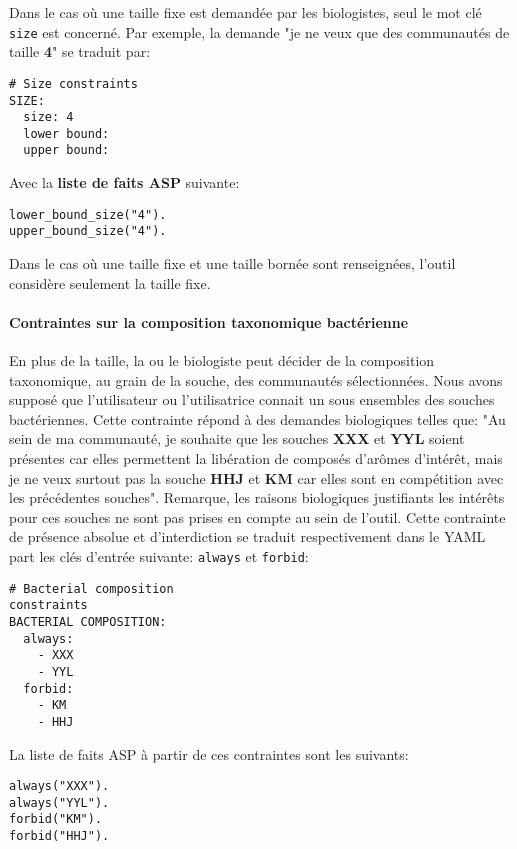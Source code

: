 \documentclass[../main.tex]{subfiles}
\begin{document}
Dans le cas où une taille fixe est demandée par les biologistes, seul le mot clé \texttt{size} est concerné. Par exemple, la demande "je ne veux que des communautés de taille \textbf{4}" se traduit par:
\begin{lstlisting}[style=yaml]
# Size constraints
SIZE:
  size: 4
  lower bound: 
  upper bound: 
\end{lstlisting}
Avec la \textbf{liste de faits ASP} suivante: \\
\begin{lstlisting}
lower_bound_size("4").
upper_bound_size("4").
\end{lstlisting}

Dans le cas où une taille fixe et une taille bornée sont renseignées, l'outil considère seulement la taille fixe.

\paragraph*{Contraintes sur la composition taxonomique bactérienne}
En plus de la taille, la ou le biologiste peut décider de la composition taxonomique, au grain de la souche, des communautés sélectionnées. Nous avons supposé que l'utilisateur ou l'utilisatrice connait un sous ensembles des souches bactériennes. Cette contrainte répond à des demandes biologiques telles que: "Au sein de ma communauté, je souhaite que les souches \textbf{XXX} et \textbf{YYL} soient présentes car elles permettent la libération de composés d'arômes d'intérêt, mais je ne veux surtout pas la souche \textbf{HHJ} et \textbf{KM} car elles sont en compétition avec les précédentes souches". Remarque, les raisons biologiques justifiants les intérêts pour ces souches ne sont pas prises en compte au sein de l'outil. Cette contrainte de présence absolue et d'interdiction se traduit respectivement dans le YAML part les clés d'entrée suivante: \texttt{always} et \texttt{forbid}:

\noindent
\begin{lstlisting}[style=yaml]
# Bacterial composition 
constraints
BACTERIAL COMPOSITION:
  always: 
    - XXX
    - YYL
  forbid: 
    - KM
    - HHJ
\end{lstlisting}

La liste de faits ASP à partir de ces contraintes sont les suivants:\\
\begin{lstlisting}
always("XXX").
always("YYL").
forbid("KM").
forbid("HHJ").
\end{lstlisting}
\end{document}
